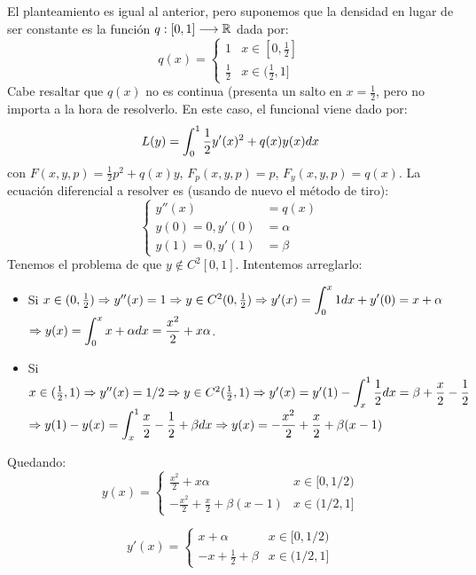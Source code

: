 El planteamiento es igual al anterior, pero suponemos que la densidad en lugar de ser constante es la función $q : [0,1] \longrightarrow \mathbb{R}$ dada por:
\[
q(x)=\left\{\begin{array}{cc}
1 & x \in[0,\frac{1}{2}] \\
\frac{1}{2} & x \in(\frac{1}{2}, 1] 
\end{array}
\right.
\]
Cabe resaltar que $q(x)$ no es continua (presenta un salto en $x=\frac{1}{2}$, pero no importa a la hora de resolverlo. En este caso, el funcional viene dado por:
\[
L(y)=\displaystyle\int_{ 0 }^{ 1 } \frac{1}{2}y'(x)^2+q(x)y(x)dx
\]
con $F(x,y,p)=\frac{1}{2}p^2+q(x)y$, $F_p(x,y,p)=p$, $F_y(x,y,p)=q(x)$. La ecuación diferencial a resolver es (usando de nuevo el método de tiro):
\[
\left\{
\begin{array}{rl}
y''(x) & = q(x) \\
y(0)  = 0,y'(0) & = \alpha \\
y(1)= 0, y'(1) & = \beta
\end{array}
\right.
\]
Tenemos el problema de que $y\notin C^2[0,1]$. Intentemos arreglarlo:
\begin{itemize}
\item Si $x\in(0,\frac{1}{2}) \Rightarrow y''(x)=1 \Rightarrow y\in C^2(0,\frac{1}{2}) \Rightarrow y'(x)=\displaystyle\int_{ 0 }^{ x } 1dx+y'(0)=x+\alpha$\\
 $\Rightarrow y(x)=\displaystyle\int_{ 0 }^{ x } x+\alpha dx=\frac{x^2}{2}+x\alpha$.
\item Si $x\in(\frac{1}{2},1) \Rightarrow y''(x)=1/2 \Rightarrow y\in C^2(\frac{1}{2},1) \Rightarrow y'(x)=y'(1)-\displaystyle\int_{ x }^{ 1 } \frac{1}{2}dx=\beta+\frac{x}{2}-\frac{1}{2}$\\
$\Rightarrow y(1)-y(x)=\displaystyle\int_{ x }^{ 1 } \frac{x}{2}-\frac{1}{2}+\beta dx\Rightarrow y(x)=-\frac{x^2}{2}+\frac{x}{2}+\beta(x-1)$
\end{itemize}
Quedando:
\begin{equation}\label{y}
y(x)=\left\{
\begin{array}{cc}
\frac{x^2}{2}+x\alpha & x\in[0,1/2) \\
-\frac{x^2}{2}+\frac{x}{2}+\beta(x-1) & x\in(1/2,1]
\end{array}
\right.
\end{equation}

\begin{equation}\label{yprima}
y'(x)=\left\{
\begin{array}{cc}
x+\alpha & x\in[0,1/2) \\
-x+\frac{1}{2}+\beta & x\in(1/2,1]
\end{array}
\right.
\end{equation}

